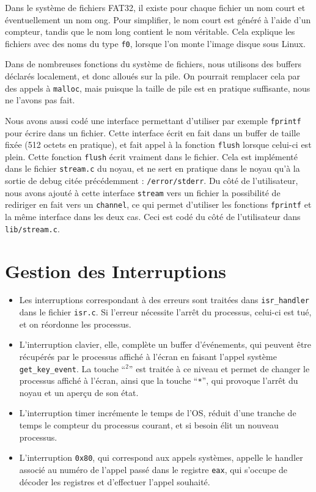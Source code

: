 \documentclass[a4paper,10pt, french]{article}
\newcommand{\code}[1]{\texttt{#1}}
\begin{document}
Dans le système de fichiers FAT32, il existe pour chaque fichier un nom court et éventuellement un nom ong. Pour simplifier, le nom court est généré à l'aide
d'un compteur, tandis que le nom long contient le nom véritable. Cela explique les fichiers avec des noms
du type \code{f0}, lorsque l'on monte l'image disque sous Linux.

Dans de nombreuses fonctions du système de fichiers, nous utilisons des buffers déclarés localement, et donc alloués sur la pile.
On pourrait remplacer cela par des appels à \code{malloc}, mais puisque la taille de pile est en pratique suffisante, nous ne l'avons pas fait.

Nous avons aussi codé une interface permettant d'utiliser par exemple \code{fprintf} pour écrire dans un fichier. Cette interface
écrit en fait dans un buffer de taille fixée (512 octets en pratique), et fait appel à la fonction \code{flush} lorsque celui-ci est plein.
Cette fonction \code{flush} écrit vraiment dans le fichier.
Cela est implémenté dans le fichier \code{stream.c} du noyau, et ne sert en pratique dans le noyau qu'à la sortie
de debug citée précédemment : \code{/error/stderr}.
Du côté de l'utilisateur, nous avons ajouté à cette interface \code{stream} vers un fichier la possibilité de rediriger en fait
vers un \code{channel}, ce qui permet d'utiliser les fonctions \code{fprintf} et la même interface dans les deux cas.
Ceci est codé du côté de l'utilisateur dans \code{lib/stream.c}.

\section{Gestion des Interruptions}
\begin{itemize}
 \item Les interruptions correspondant à des erreurs sont traitées dans \code{isr\_handler} dans le fichier \code{isr.c}.
Si l'erreur nécessite l'arrêt du processus, celui-ci est tué, et on réordonne les processus.
 \item L'interruption clavier, elle, complète un buffer d'événements, qui peuvent être récupérés par le processus affiché à l'écran
en faisant l'appel système \code{get\_key\_event}. La touche ``$^2$'' est traitée à ce niveau et permet de changer le processus affiché
à l'écran, ainsi que la touche ``\code{*}'', qui provoque l'arrêt du noyau et un aperçu de son état.
 \item L'interruption timer incrémente le temps de l'OS, réduit d'une tranche de temps le compteur du processus courant,
et si besoin élit un nouveau processus.
 \item L'interruption \code{0x80}, qui correspond aux appels systèmes, appelle le handler associé au numéro de l'appel
passé dans le registre \code{eax}, qui s'occupe de décoder les registres et d'effectuer l'appel souhaité.
\end{itemize}
\end{document}
